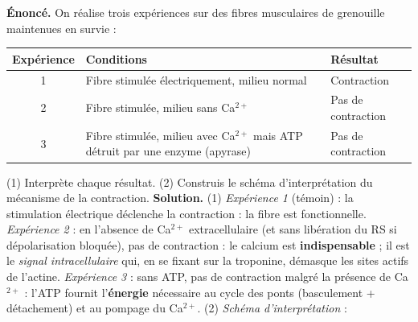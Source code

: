 \documentclass[11pt]{article}
\begin{document}
\begin{exoresolu}
\textbf{Énoncé.} On réalise trois expériences sur des fibres musculaires de grenouille maintenues en survie :
\begin{center}
\begin{tabularx}{\linewidth}{|c|X|X|}\hline
\rowcolor{popblueL} Expérience & Conditions & Résultat \\ \hline
1 & Fibre stimulée électriquement, milieu normal & Contraction \\ \hline
2 & Fibre stimulée, milieu sans Ca$^{2+}$ & Pas de contraction \\ \hline
3 & Fibre stimulée, milieu avec Ca$^{2+}$ mais ATP détruit par une enzyme (apyrase) & Pas de contraction \\ \hline
\end{tabularx}
\end{center}
(1) Interprète chaque résultat. (2) Construis le schéma d'interprétation du mécanisme de la contraction.
\tcblower
\textbf{Solution.}
(1) \emph{Expérience 1} (témoin) : la stimulation électrique déclenche la contraction : la fibre est fonctionnelle. \emph{Expérience 2} : en l'absence de Ca$^{2+}$ extracellulaire (et sans libération du RS si dépolarisation bloquée), pas de contraction : le calcium est \textbf{indispensable} ; il est le \emph{signal intracellulaire} qui, en se fixant sur la troponine, démasque les sites actifs de l'actine. \emph{Expérience 3} : sans ATP, pas de contraction malgré la présence de Ca$^{2+}$ : l'ATP fournit l'\textbf{énergie} nécessaire au cycle des ponts (basculement + détachement) et au pompage du Ca$^{2+}$.
(2) \emph{Schéma d'interprétation} :
\begin{popfigure}
\end{popfigure}
\end{exoresolu}
\end{document}
